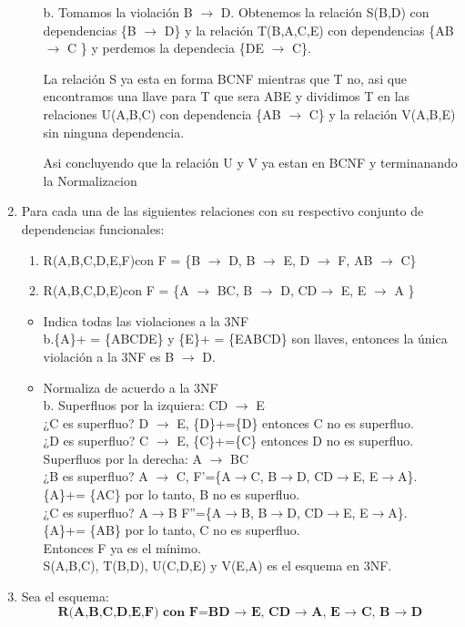 \documentclass[a4paper, 12pt]{report}
\begin{document}
\begin{enumerate}
\begin{itemize}
	b. Tomamos la violación B $\rightarrow$ D.
	Obtenemos la relación S(B,D) con dependencias \{B $\rightarrow$ D\} y la relación T(B,A,C,E) con dependencias \{AB $\rightarrow$ C \} y perdemos la dependecia \{DE $\rightarrow$ C\}.
	
La relación S ya esta en forma BCNF mientras que  T no, asi que encontramos una llave para T que sera ABE y dividimos T en las relaciones U(A,B,C) con dependencia \{AB $\rightarrow$ C\} y la relación V(A,B,E) sin ninguna dependencia.

Asi concluyendo que la relación U y V ya estan en BCNF y terminanando la Normalizacion




	
\end{itemize}
\item Para cada una de  las  siguientes  relaciones  con  su  respectivo  conjunto  de  dependencias funcionales:
\begin{enumerate}
	\item R(A,B,C,D,E,F)con F = \{B $\rightarrow$ D, B $\rightarrow$ E, D $\rightarrow$ F, AB $\rightarrow$ C\}
	\item R(A,B,C,D,E)con F = \{A $\rightarrow$ BC, B $\rightarrow$ D, CD$\rightarrow$ E, E $\rightarrow$ A \}
\end{enumerate}
\begin{itemize}
	\item Indica todas las violaciones a la 3NF\\
	b.\{A\}+ = \{ABCDE\} y \{E\}+ = \{EABCD\} son llaves, entonces la única
	violación a la 3NF es B $\rightarrow$ D.
	\item Normaliza de acuerdo a la 3NF\\
	b. Superfluos por la izquiera:  CD $\rightarrow$ E\\
	¿C es superfluo? D $\rightarrow$ E, \{D\}+=\{D\} entonces C no es superfluo.\\
	¿D es superfluo? C $\rightarrow$ E, \{C\}+=\{C\} entonces D no es superfluo.\\
	Superfluos por la derecha: A $\rightarrow$ BC\\
	¿B es superfluo? A $\rightarrow$ C, F'=\{A$\rightarrow$C, B$\rightarrow$D, CD$\rightarrow$E, E$\rightarrow$A\}.\\
	\{A\}+= \{AC\} por lo tanto, B no es superfluo.\\
	¿C es superfluo? A$\rightarrow$B F''=\{A$\rightarrow$B, B$\rightarrow$D, CD$\rightarrow$E, E$\rightarrow$A\}.\\
	\{A\}+= \{AB\} por lo tanto, C no es superfluo.\\
	Entonces F ya es el mínimo.\\
	S(A,B,C), T(B,D), U(C,D,E) y V(E,A) es el esquema en 3NF.
\end{itemize}
\item Sea el esquema: 
$$\textbf{R(A,B,C,D,E,F) con F={BD → E, CD → A, E → C, B → D}}$$


\end{enumerate}
\end{document}
